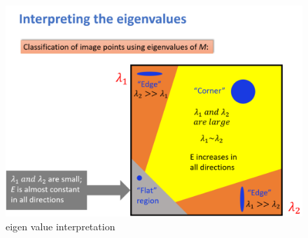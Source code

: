 \documentclass[11pt]{article}
\makeatletter
\def\maxwidth{\ifdim\Gin@nat@width>\linewidth\linewidth
    \else\Gin@nat@width\fi}
\let\Oldincludegraphics\includegraphics
\renewcommand{\includegraphics}[1]{\Oldincludegraphics[width=.8\maxwidth]{#1}}
\makeatother
\begin{document}
    \begin{figure}
\centering
\includegraphics{wiki/eigen.png}
\caption{eigen value interpretation}
\end{figure}
\end{document}
